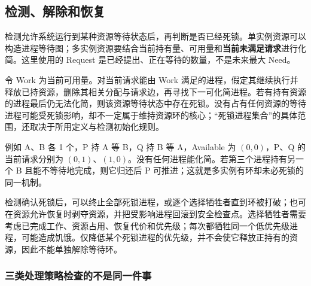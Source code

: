 \subsection{检测、解除和恢复}\label{OS02-4-4}

检测允许系统运行到某种资源等待状态后，再判断是否已经死锁。单实例资源可以构造进程等待图；多实例资源要结合当前持有量、可用量和\textbf{当前未满足请求}进行化简。这里使用的 Request 是已经提出、正在等待的数量，不是未来最大 Need。

令 Work 为当前可用量。对当前请求能由 Work 满足的进程，假定其继续执行并释放已持资源，删除其相关分配与请求边，再寻找下一可化简进程。若有持有资源的进程最后仍无法化简，则该资源等待状态中存在死锁。没有占有任何资源的等待进程可能受死锁影响，却不一定属于维持资源环的核心；``死锁进程集合''的具体范围，还取决于所用定义与检测初始化规则。

例如 A、B 各 1 个，P 持 A 等 B，Q 持 B 等 A，Available 为 \((0,0)\)，P、Q 的当前请求分别为 \((0,1)\)、\((1,0)\)。没有任何进程能化简。若第三个进程持有另一个 B 且能不等待地完成，则它归还后 P 可推进；这就是多实例有环却未必死锁的同一机制。

检测确认死锁后，可以终止全部死锁进程，或逐个选择牺牲者直到环被打破；也可在资源允许恢复时剥夺资源，并把受影响进程回滚到安全检查点。选择牺牲者需要考虑已完成工作、资源占用、恢复代价和优先级；每次都牺牲同一个低优先级进程，可能造成饥饿。仅降低某个死锁进程的优先级，并不会使它释放正持有的资源，因此不能单独解除等待环。

\subsubsection{三类处理策略检查的不是同一件事}\label{OS02-auto-29}

